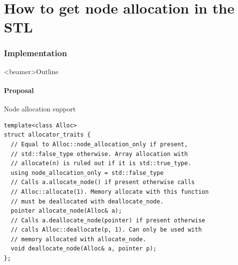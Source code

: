\documentclass[10pt,aspectratio=169]{beamer}
\def\mbu{\node[style=mbu]}
\def\mbd{\node[style=mbd]}
\def\mbq{\node[style=mbq]}
\def\mbo{\node[style=mbo]}
\def\ebu{\node[style=ebu]}
\def\ebd{\node[style=ebd]}
\def\ebq{\node[style=ebq]}
\def\ebo{\node[style=ebo]}
\begin{document}
%
%
%
%
%
%

\part{How to get node allocation in the STL}

\section[Implementation]{Implementation}

\begin{frame}<beamer>{Outline}
\end{frame}

\subsection[Proposal]{Proposal}
\begin{frame}[fragile]{Node allocation support}

\begin{lstlisting}
template<class Alloc>
struct allocator_traits {
  // Equal to Alloc::node_allocation_only if present,
  // std::false_type otherwise. Array allocation with
  // allocate(n) is ruled out if it is std::true_type.
  using node_allocation_only = std::false_type
  // Calls a.allocate_node() if present otherwise calls
  // Alloc::allocate(1). Memory allocate with this function
  // must be deallocated with deallocate_node.
  pointer allocate_node(Alloc& a);
  // Calls a.deallocate_node(pointer) if present otherwise
  // calls Alloc::deallocate(p, 1). Can only be used with
  // memory allocated with allocate_node.
  void deallocate_node(Alloc& a, pointer p);
};
\end{lstlisting}

\end{frame}
\end{document}
